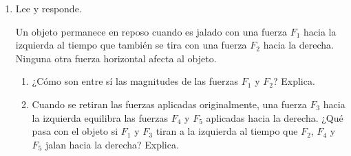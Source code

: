 \documentclass[11pt]{book}
\begin{document}
\begin{boxK}
\begin{enumerate}
        \item Lee y responde.
              \begin{boxF}
                  Un objeto permanece en reposo cuando es jalado con una fuerza $F_1$
                  hacia la izquierda al tiempo que también se tira con una fuerza $F_2$
                  hacia la derecha. Ninguna otra fuerza horizontal afecta al objeto.
              \end{boxF}

              \begin{enumerate}
                  \item ¿Cómo son entre sí las magnitudes de las fuerzas $F_1$ y $F_2$? Explica.
                  \item Cuando se retiran las fuerzas aplicadas originalmente, una fuerza $F_3$
                        hacia la izquierda equilibra las fuerzas $F_4$ y $F_5$ aplicadas hacia la derecha. ¿Qué pasa con el objeto si $F_1$ y $F_3$
                        tiran a la izquierda al tiempo que $F_2$, $F_4$ y $F_5$ jalan hacia la derecha? Explica.
              \end{enumerate}
    \end{enumerate}

\end{boxK}

\newpage
\end{document}
